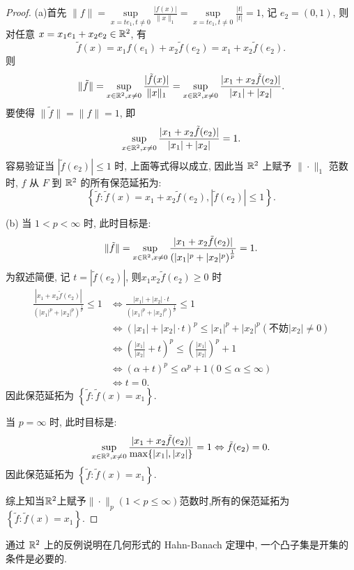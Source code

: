 \begin{proof}
    (a)首先 $\|f\|=\sup\limits_{x=te_1,t\neq 0}\frac{|f(x)|}{\|x\|_1}=\sup\limits_{x=te_1,t\neq0}\frac{|t|}{|t|}=1$,
    记 $e_2=(0,1)$, 则对任意 $x=x_1e_1+x_2e_2\in\mathbb{R}^2$, 有
    \[\tilde{f}(x)=x_1f(e_1)+x_2\tilde{f}(e_2)=x_1+x_2\tilde{f}(e_2).\]
    则
    \[\|\tilde{f}\|=\sup_{x\in\mathbb{R}^2,x\neq 0}\frac{|\tilde{f}(x)|}{\|x\|_1}=\sup_{x\in\mathbb{R}^2,x\neq 0}\frac{|x_1+x_2\tilde{f}(e_2)|}{|x_1|+|x_2|}.\]
    要使得 $\|\tilde{f}\|=\|f\|=1$, 即
    \[\sup_{x\in\mathbb{R}^2,x\neq 0}\frac{|x_1+x_2\tilde{f}(e_2)|}{|x_1|+|x_2|}=1.\]
    容易验证当 $|\tilde{f}(e_2)|\leq 1$ 时, 上面等式得以成立, 
    因此当 $\mathbb{R}^2$ 上赋予 $\|\cdot\|_1$ 范数时, $f$ 从 $F$ 到 $\mathbb{R}^2$ 的所有保范延拓为:
    \[\left\{\tilde{f}:\tilde{f}(x)=x_1+x_2\tilde{f}(e_2),|\tilde{f}(e_2)|\leq1\right\}.\]

    (b) 当 $1<p<\infty$ 时, 此时目标是:
    \[\|\tilde{f}\|=\sup_{x\in\mathbb{R}^2,x\neq0}\frac{|x_1+x_2\tilde{f}(e_2)|}{\left(|x_1|^p+|x_2|^p\right)^{\frac{1}{p}}}=1.\]
    为叙述简便, 记 $t=|\tilde{f}(e_2)|$, 则$x_1x_2\tilde{f}(e_2)\geq 0$ 时
    \[\begin{split}\frac{|x_1+x_2\tilde{f}(e_2)|}{\left(|x_1|^p+|x_2|^p\right)^{\frac{1}{p}}}\leq 1
    &\Leftrightarrow \frac{|x_1|+|x_2|\cdot t}{\left(|x_1|^p+|x_2|^p\right)^{\frac{1}{p}}}\leq1\\
    &\Leftrightarrow (|x_1|+|x_2|\cdot t)^p\leq|x_1|^p+|x_2|^p(\mbox{不妨}|x_2|\neq0)\\
    &\Leftrightarrow\left(\frac{|x_1|}{|x_2|}+t\right)^p\leq\left(\frac{|x_1|}{|x_2|}\right)^p+1\\
    &\Leftrightarrow (\alpha+t)^p\leq\alpha^p+1(0\leq\alpha\leq\infty)\\
    &\Leftrightarrow t=0.
    \end{split}\]
    因此保范延拓为 $\left\{\tilde{f}:\tilde{f}(x)=x_1\right\}$.
    
    当 $p=\infty$ 时, 此时目标是:
    \[\sup_{x\in\mathbb{R}^2,x\neq 0}\frac{|x_1+x_2\tilde{f}(e_2)|}{\max\{|x_1|,|x_2|\}}=1\Leftrightarrow\tilde{f}(e_2)=0.\]
    因此保范延拓为 $\left\{\tilde{f}:\tilde{f}(x)=x_1\right\}$.

    综上知当$\mathbb{R}^2$上赋予$\|\cdot\|_p(1<p\leq\infty)$范数时,所有的保范延拓为$\left\{\tilde{f}:\tilde{f}(x)=x_1\right\}$.
\end{proof}



\begin{exercise}
    通过 $\mathbb{R}^2$ 上的反例说明在几何形式的 Hahn-Banach 定理中, 一个凸子集是开集的条件是必要的.
\end{exercise}

